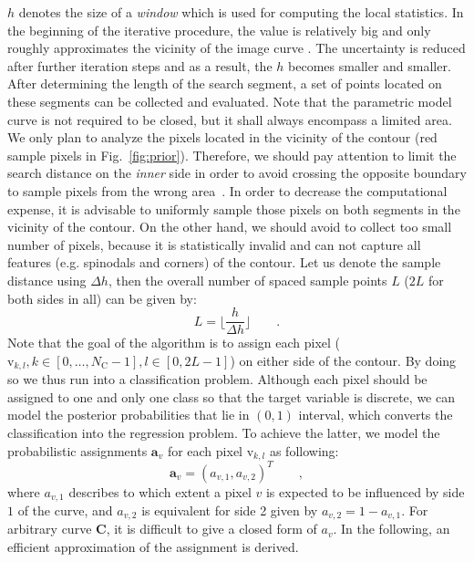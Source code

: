 \documentclass[conference]{IEEEtran}
\begin{document}
$h$ denotes the size of a \textit{window} which is used for computing
the local statistics. In the beginning of the iterative procedure, the value
is relatively big and only roughly approximates the vicinity of the image curve
. The
uncertainty is reduced after further iteration steps and as a result, the $h$ becomes smaller and
smaller. After determining the length of the search segment, 
a set of points located on these segments can be collected and
evaluated. Note that the parametric model curve is not required to be
closed, but it shall always encompass a limited area. We only plan to
analyze the pixels located in the vicinity of the contour (red sample
pixels in Fig.~\ref{fig:prior}). Therefore,
we should pay attention to limit the search distance on the
\textit{inner} side in order to avoid crossing the opposite
boundary to sample pixels from the wrong area~\cite{panin2006fully}. In order to
decrease the computational expense, it is advisable to uniformly sample those
pixels on both segments in the vicinity of the contour. On the other
hand, we should avoid to collect too small number of pixels, because
it is statistically invalid and can not
capture all features (e.g. spinodals and corners) of the contour. Let us denote the
sample distance using $\Delta h$, then the overall number of spaced
sample points $L$ ($2L$ for both sides in all) can be given by:
\begin{equation}
  \label{eq:sample}
  L = \lfloor \frac{h}{\Delta h} \rfloor\qquad.
\end{equation}
Note that the goal of the algorithm is to assign each pixel
($\mathrm{v}_{k,l}, k \in [0,\ldots,N_{\mathrm{C}}-1], l \in [0,
2L-1]$) on either side of the contour. By doing so we thus run into a
classification problem.
Although each pixel should be assigned to one and only
one class so that the target variable is discrete, we can model the
posterior probabilities that lie in $(0,1)$ interval, which converts the classification into the regression problem. To achieve the latter, we model the probabilistic
assignments $\mathbf{a}_{v}$ for each pixel $\mathrm{v}_{k,l}$ as following:
\begin{equation}
  \label{eq:pa}
  \mathbf{a}_v  = (a_{v,1}, a_{v,2})^T\qquad,
\end{equation}
where $a_{v,1}$ describes to which extent a pixel $v$ is expected to
be influenced by side $1$ of the curve, and $a_{v,2}$ is equivalent
for side 2 given by $a_{v,2} = 1- a_{v,1}$. For arbitrary curve
$\mathbf{C}$, it is difficult to give a closed form of $a_v$. In the
following, an efficient approximation of the assignment is derived.
\end{document}
